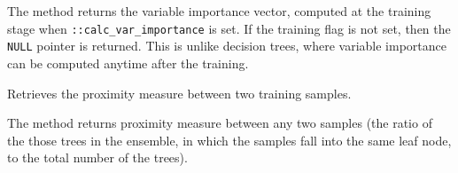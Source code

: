 The method returns the variable importance vector, computed at the training stage when \texttt{::calc\_var\_importance} is set. If the training flag is not set, then the \texttt{NULL} pointer is returned. This is unlike decision trees, where variable importance can be computed anytime after the training.



Retrieves the proximity measure between two training samples.


The method returns proximity measure between any two samples (the ratio of the those trees in the ensemble, in which the samples fall into the same leaf node, to the total number of the trees).



